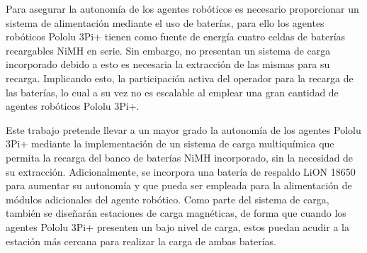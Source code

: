 Para asegurar la autonomía de los agentes robóticos es necesario proporcionar un sistema
de alimentación mediante el uso de baterías, para ello los agentes robóticos Pololu 3Pi+
 tienen como fuente de energía cuatro celdas de 
 baterías recargables NiMH en serie. Sin embargo, no presentan un sistema de
 carga incorporado debido a esto es necesaria la extracción de las mismas para 
 su recarga. Implicando esto, la participación activa del operador
 para la recarga de las baterías, lo cual a su vez no es escalable  al emplear una gran cantidad de
 agentes robóticos Pololu 3Pi+.

Este trabajo pretende llevar a un mayor grado la autonomía de los agentes Pololu 3Pi+ mediante
la implementación de un sistema de carga multiquímica que permita la recarga del banco de baterías
NiMH incorporado, sin la necesidad de su extracción. Adicionalmente, se incorpora una batería de 
respaldo LiON 18650 para aumentar su autonomía y que pueda ser empleada para la alimentación de módulos
adicionales del agente robótico. Como parte del sistema de carga, también se diseñarán estaciones de carga
magnéticas, de forma que cuando los agentes Pololu 3Pi+ presenten un bajo nivel de carga, estos puedan acudir 
a la estación más cercana para realizar la carga de ambas baterías. 